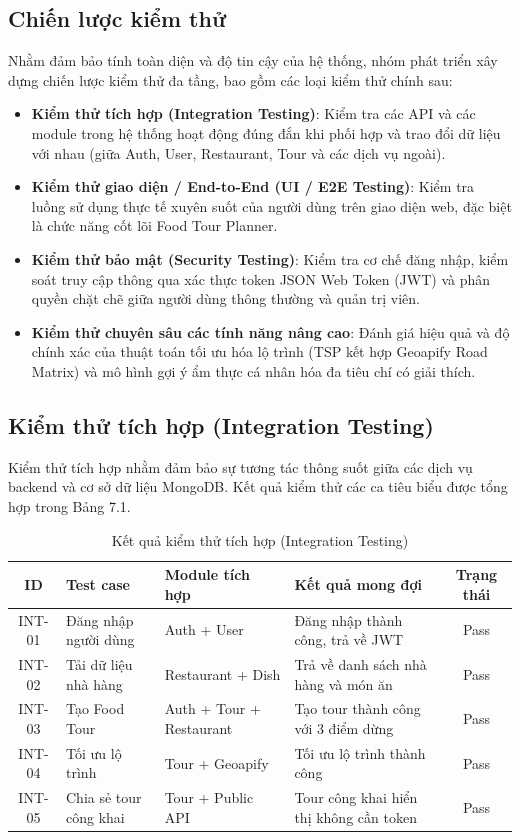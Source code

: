 \subsection{Chiến lược kiểm thử}
Nhằm đảm bảo tính toàn diện và độ tin cậy của hệ thống, nhóm phát triển xây dựng chiến lược kiểm thử đa tầng, bao gồm các loại kiểm thử chính sau:
\begin{itemize}[label=\textbullet]
    \item \textbf{Kiểm thử tích hợp (Integration Testing)}: Kiểm tra các API và các module trong hệ thống hoạt động đúng đắn khi phối hợp và trao đổi dữ liệu với nhau (giữa Auth, User, Restaurant, Tour và các dịch vụ ngoài).
    \item \textbf{Kiểm thử giao diện / End-to-End (UI / E2E Testing)}: Kiểm tra luồng sử dụng thực tế xuyên suốt của người dùng trên giao diện web, đặc biệt là chức năng cốt lõi Food Tour Planner.
    \item \textbf{Kiểm thử bảo mật (Security Testing)}: Kiểm tra cơ chế đăng nhập, kiểm soát truy cập thông qua xác thực token JSON Web Token (JWT) và phân quyền chặt chẽ giữa người dùng thông thường và quản trị viên.
    \item \textbf{Kiểm thử chuyên sâu các tính năng nâng cao}: Đánh giá hiệu quả và độ chính xác của thuật toán tối ưu hóa lộ trình (TSP kết hợp Geoapify Road Matrix) và mô hình gợi ý ẩm thực cá nhân hóa đa tiêu chí có giải thích.
\end{itemize}

\subsection{Kiểm thử tích hợp (Integration Testing)}
Kiểm thử tích hợp nhằm đảm bảo sự tương tác thông suốt giữa các dịch vụ backend và cơ sở dữ liệu MongoDB. Kết quả kiểm thử các ca tiêu biểu được tổng hợp trong Bảng 7.1.

\begin{table}[H]
\centering
\small
\caption{Kết quả kiểm thử tích hợp (Integration Testing)}
\label{tab:test_int}
\begin{tabularx}{\textwidth}{|c|p{3.2cm}|p{3.5cm}|X|c|}
\hline
\textbf{ID} & \textbf{Test case} & \textbf{Module tích hợp} & \textbf{Kết quả mong đợi} & \textbf{Trạng thái} \\
\hline
INT-01 & Đăng nhập người dùng & Auth + User & Đăng nhập thành công, trả về JWT & Pass \\
\hline
INT-02 & Tải dữ liệu nhà hàng & Restaurant + Dish & Trả về danh sách nhà hàng và món ăn & Pass \\
\hline
INT-03 & Tạo Food Tour & Auth + Tour + Restaurant & Tạo tour thành công với 3 điểm dừng & Pass \\
\hline
INT-04 & Tối ưu lộ trình & Tour + Geoapify & Tối ưu lộ trình thành công & Pass \\
\hline
INT-05 & Chia sẻ tour công khai & Tour + Public API & Tour công khai hiển thị không cần token & Pass \\
\hline
\end{tabularx}
\end{table}

